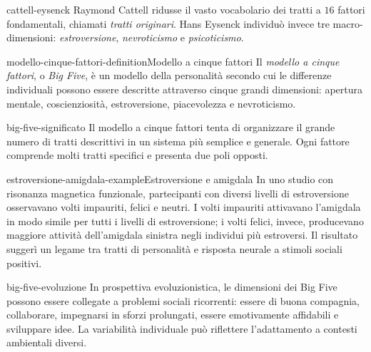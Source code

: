 \documentclass[preview]{standalone}
\begin{document}

\begin{snippet}{cattell-eysenck}
    Raymond Cattell ridusse il vasto vocabolario dei tratti a \(16\) fattori
    fondamentali, chiamati \emph{tratti originari}. Hans Eysenck individuò
    invece tre macro-dimensioni: \emph{estroversione}, \emph{nevroticismo} e
    \emph{psicoticismo}.
\end{snippet}

\begin{snippetdefinition}{modello-cinque-fattori-definition}{Modello a cinque fattori}
    Il \emph{modello a cinque fattori}, o \emph{Big Five}, è un modello della
    personalità secondo cui le differenze individuali possono essere descritte
    attraverso cinque grandi dimensioni: apertura mentale, coscienziosità,
    estroversione, piacevolezza e nevroticismo.
\end{snippetdefinition}


\begin{snippet}{big-five-significato}
    Il modello a cinque fattori tenta di organizzare il grande numero di tratti
    descrittivi in un sistema più semplice e generale. Ogni fattore comprende
    molti tratti specifici e presenta due poli opposti.
\end{snippet}

\begin{snippetexample}{estroversione-amigdala-example}{Estroversione e amigdala}
    In uno studio con risonanza magnetica funzionale, partecipanti con diversi
    livelli di estroversione osservavano volti impauriti, felici e neutri. I
    volti impauriti attivavano l'amigdala in modo simile per tutti i livelli di
    estroversione; i volti felici, invece, producevano maggiore attività
    dell'amigdala sinistra negli individui più estroversi. Il risultato suggerì
    un legame tra tratti di personalità e risposta neurale a stimoli sociali
    positivi.
\end{snippetexample}


\begin{snippet}{big-five-evoluzione}
    In prospettiva evoluzionistica, le dimensioni dei Big Five possono essere
    collegate a problemi sociali ricorrenti: essere di buona compagnia,
    collaborare, impegnarsi in sforzi prolungati, essere emotivamente affidabili
    e sviluppare idee. La variabilità individuale può riflettere l'adattamento a
    contesti ambientali diversi.
\end{snippet}
\end{document}
